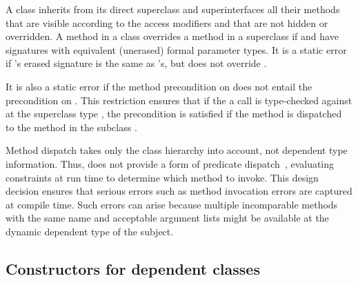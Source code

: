 A class  inherits from its direct superclass and
superinterfaces all their methods that are visible according to the access
modifiers and that are not hidden or overridden. A method
 in a class  overrides a method  in a
superclass  if  and  have signatures
with equivalent (unerased) formal parameter types.
It is a static error if 's erased signature is the same
as 's, but  does not override .

It is also a static error if the method precondition on
 does
not entail the precondition on .  This restriction
ensures that if the a call
is type-checked against  at the superclass type ,
the precondition is satisfied if the method is dispatched to the
method  in the subclass .

Method dispatch takes only the class hierarchy into account, not 
dependent type information.  Thus, \Xten{} does not provide a
form
of predicate dispatch~\cite{predicateClasses,jpred}, 
evaluating constraints at run time to determine which method to
invoke.
This design decision ensures that
serious errors such as method invocation errors are captured at
compile time. Such errors can arise because multiple incomparable
methods with the same name and acceptable argument lists might be
available at the dynamic dependent type of the subject.


\subsection{Constructors for dependent classes}


